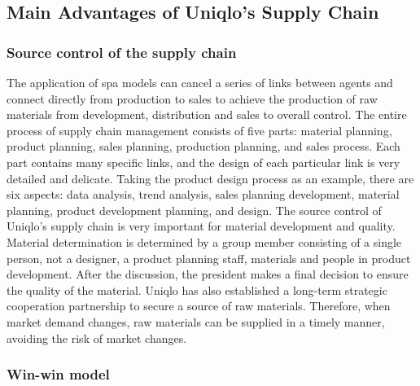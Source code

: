 \documentclass[12pt,a4paper]{article}
\begin{document}
\hypertarget{main-advantages-of-uniqlos-supply-chain}{%
\subsection{Main Advantages of Uniqlo's Supply
Chain}\label{main-advantages-of-uniqlos-supply-chain}}

\hypertarget{source-control-of-the-supply-chain}{%
\subsubsection{Source control of the supply
chain}\label{source-control-of-the-supply-chain}}

The application of spa models can cancel a series of links between
agents and connect directly from production to sales to achieve the
production of raw materials from development, distribution and sales to
overall control. The entire process of supply chain management consists
of five parts: material planning, product planning, sales planning,
production planning, and sales process. Each part contains many specific
links, and the design of each particular link is very detailed and
delicate. Taking the product design process as an example, there are six
aspects: data analysis, trend analysis, sales planning development,
material planning, product development planning, and design. The source
control of Uniqlo's supply chain is very important for material
development and quality. Material determination is determined by a group
member consisting of a single person, not a designer, a product planning
staff, materials and people in product development. After the
discussion, the president makes a final decision to ensure the quality
of the material. Uniqlo has also established a long-term strategic
cooperation partnership to secure a source of raw materials. Therefore,
when market demand changes, raw materials can be supplied in a timely
manner, avoiding the risk of market changes.

\hypertarget{win-win-model}{%
\subsubsection{Win-win model}\label{win-win-model}}
\end{document}
